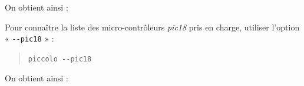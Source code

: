 On obtient ainsi : 



Pour connaître la liste des micro-contrôleurs \emph{pic18} pris en charge, utiliser l’option « \texttt{-{}-pic18} » :
\begin{quote}
\texttt{piccolo -{}-pic18}
\end{quote}


On obtient ainsi : 


